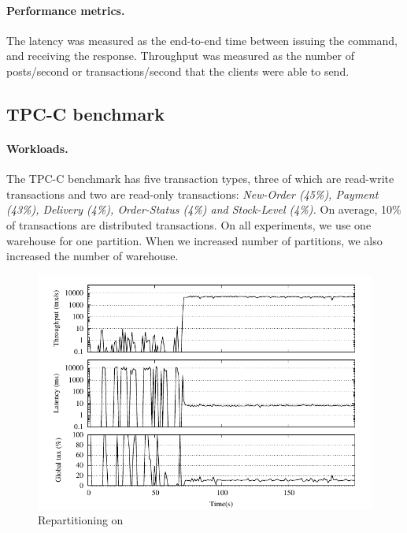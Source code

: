 \paragraph*{Performance metrics.}
%
The latency was measured as the end-to-end time between issuing the
command, and receiving the response.  Throughput was measured as the
number of posts/second or transactions/second that the clients were able to send.

\subsection{TPC-C benchmark}
\label{sec:evaluation:tpc-c}

\paragraph*{Workloads.}
The TPC-C benchmark has five transaction types, three of which are read-write 
transactions and two are read-only transactions: \textit{New-Order (45\%), Payment (43\%), Delivery
(4\%), Order-Status (4\%) and Stock-Level (4\%).} On average, 10\%
of transactions are distributed transactions. On all experiments, we use one warehouse for
one partition. When we increased number of partitions, we also increased the number
of warehouse.

\begin{figure}[ht!]
  \centering
    \includegraphics[width=\columnwidth]{figures/experiments/tpcc-repartitioning/tpcc-repartitioning}
  \caption{Repartitioning on \dynastar}
  \label{fig:tpcc_repartitioning}
\end{figure}


